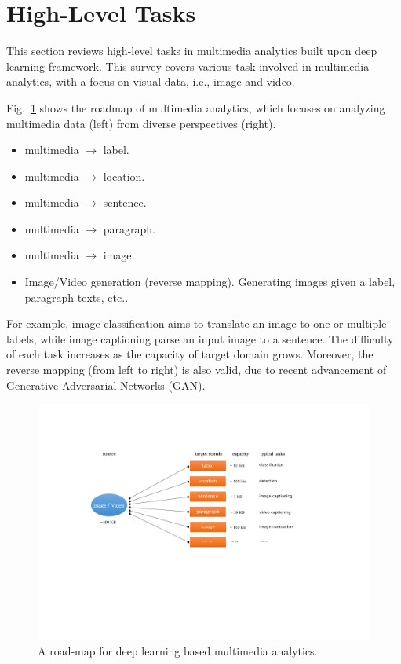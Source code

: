
\section{High-Level Tasks}
\label{sec:apps}




This section reviews high-level tasks in multimedia analytics built upon deep learning framework. This survey covers various task involved in multimedia analytics, with a focus on visual data, i.e., image and video. 

Fig.~\ref{fig:overview} shows the roadmap of multimedia analytics, which focuses on analyzing multimedia data (left) from diverse perspectives (right). 

\begin{itemize}
	\item multimedia $\rightarrow$ label.
	\item multimedia $\rightarrow$ location. 
	\item multimedia $\rightarrow$ sentence.
	\item multimedia $\rightarrow$ paragraph.
	\item multimedia $\rightarrow$ image.
	\item Image/Video generation (reverse mapping). Generating images given a label, paragraph texts, etc..
\end{itemize}

For example, image classification aims to translate an image to one or multiple labels, while image captioning parse an input image to a sentence. The difficulty of each task increases as the capacity of target domain grows. Moreover, the reverse mapping (from left to right) is also valid, due to recent advancement of Generative Adversarial Networks (GAN). 


\begin{figure}[t]
	\begin{center}
		\includegraphics[width=5in]{figs/overview.pdf}
	\end{center}
	\caption{A road-map for deep learning based multimedia analytics. }
	\label{fig:overview}
\end{figure}

